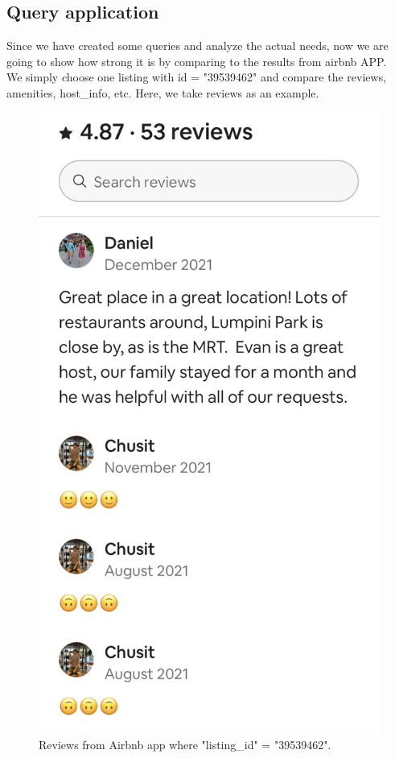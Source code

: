 \documentclass{article}
\begin{document}
	\subsection{Query application\label{chapter8.3}}
	Since we have created some queries and analyze the actual needs, now we are going to show how strong it is by comparing to the results from airbnb APP.
	\\
	We simply choose one listing with id = "39539462" and compare the reviews, amenities, host\_info, etc. Here, we take reviews as an example. 
	\begin{figure}[h]
		\centering
		\includegraphics[width=.18\textheight]{query_result_1.png}
		\caption{Reviews from Airbnb app where "listing\_id" = "39539462".}
		\label{fig:015}
	\end{figure}
\end{document}
